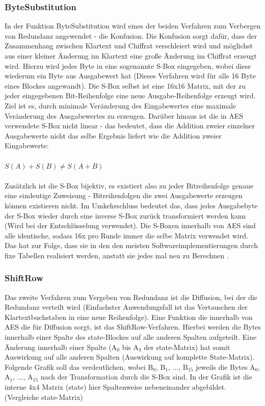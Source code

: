 \documentclass[10pt, a4paper,headsepline]{scrreprt}
\begin{document}
\subsubsection{ByteSubstitution}
In der Funktion ByteSubstitution wird eines der beiden Verfahren zum Verbergen von Redundanz angewendet - die Konfusion. Die Konfusion sorgt dafür, dass der Zusammenhang zwischen Klartext und Chiffrat verschleiert wird und möglichst aus einer kleiner Änderung im Klartext eine große Änderung im Chiffrat erzeugt wird. Hierzu wird jedes Byte in eine sogenannte S-Box eingegeben, wobei diese  wiederum ein Byte aus Ausgabewert hat (Dieses Verfahren wird für alle 16 Byte eines Blockes angewandt). Die S-Box selbst ist eine 16x16 Matrix, mit der zu jeder eingegebenen Bit-Reihenfolge eine neue Ausgabe-Reihenfolge erzeugt wird. Ziel ist es, durch minimale Veränderung des Eingabewertes eine maximale Veränderung des Ausgabewertes zu erzeugen. Darüber hinaus ist die in AES verwendete S-Box nicht linear - das bedeutet, dass die Addition zweier einzelner Ausgabewerte nicht das selbe Ergebnis liefert wie die Addition zweier Eingabewerte:\\ \\
\(S(A) + S(B) \neq S(A+B)\) \\ \\
Zusätzlich ist die S-Box bijektiv, es existiert also zu jeder Bitreihenfolge genaue eine eindeutige Zuweisung - Bitreihenfolgen die zwei Ausgabewerte erzeugen können existieren nicht. Im Umkehrschluss bedeutet das, dass jedes Ausgabebyte der S-Box wieder durch eine inverse S-Box zurück transformiert werden kann (Wird bei der Entschlüsselung verwendet). Die S-Boxen innerhalb von AES sind alle identische, sodass 16x pro Runde immer die selbe Matrix verwendet wird. Das hat zur Folge, dass sie in den den meisten Softwareimplementierungen durch fixe Tabellen realisiert werden, anstatt sie jedes mal neu zu Berechnen \citep[S. 101ff]{book:understanding-crypto}.


\subsubsection{ShiftRow}
Das zweite Verfahren zum Vergeben von Redundanz ist die Diffusion, bei der die Redundanz verteilt wird (Einfachster Anwendungsfall ist das Vertauschen der Klartextbuchstaben in eine neue Reihenfolge). Eine Funktion die innerhalb von AES die für Diffusion sorgt, ist das ShiftRow-Verfahren. Hierbei werden die Bytes innerhalb einer Spalte des state-Blockes auf alle anderen Spalten aufgeteilt. Eine Änderung innerhalb einer Spalte (A$_{0}$ bis A$_{3}$ der state-Matrix) hat somit Auswirkung auf alle anderen Spalten (Auswirkung auf komplette State-Matrix). Folgende Grafik soll das verdeutlichen, wobei B$_{0}$, B$_{1}$, ..., B$_{15}$ jeweils die Bytes A$_{0}$, A$_{1}$, ..., A$_{15}$ nach der Transformation durch die S-Box sind. In der Grafik ist die interne 4x4 Matrix (state) hier Spaltenweise nebeneinander abgebildet. (Vergleiche state-Matrix)  \\ \\
\end{document}
